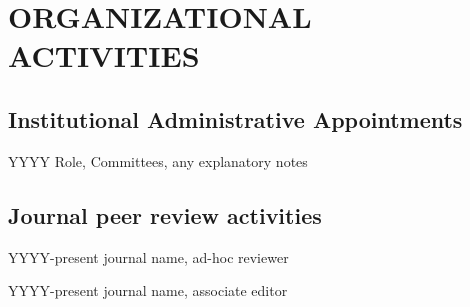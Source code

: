 \documentclass[11pt]{article}
\newenvironment{lyxlist}[1]
	{\begin{list}{}
		{\setlength\itemsep{-0.5ex}
		\settowidth{\labelwidth}{#1}
		 \setlength{\leftmargin}{\labelwidth}
		 \addtolength{\leftmargin}{\labelsep}
		 \renewcommand{\makelabel}[1]{##1\hfil}}}
	{\end{list}}
\begin{document}
	
	

\section*{ORGANIZATIONAL ACTIVITIES}
\subsection*{Institutional Administrative Appointments}
\begin{lyxlist}{0000-present}
\item[{YYYY}]Role, Committees, any explanatory notes
\end{lyxlist}

\subsection*{Journal peer review activities}

\begin{lyxlist}{JHMI/regional}
\item[{YYYY-present}]journal name, ad-hoc reviewer
\item[{YYYY-present}]journal name, associate editor
\end{lyxlist}
\end{document}
